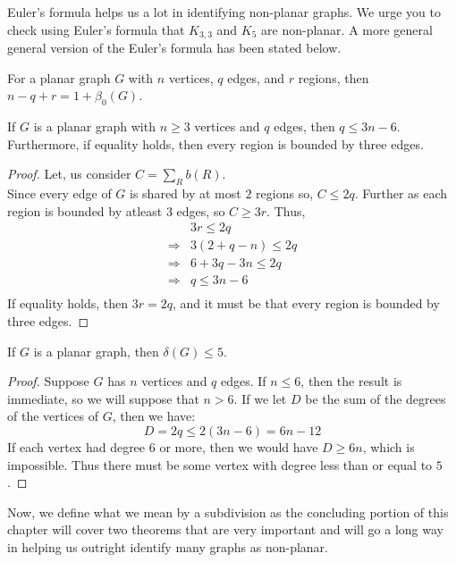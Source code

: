 \documentclass[../basic_graph_theory.tex]{subfiles}
\begin{document}
Euler's formula helps us a lot in identifying non-planar graphs. We urge you to check using Euler's formula that $K_{3,3}$ and $K_5$ are non-planar. A more general general version of the Euler's formula has been stated below.

\begin{thm}
    For a planar graph $G$ with $n$ vertices, $q$ edges, and $r$ regions, then $n-q+r=1+\beta_{0}(G)$.
\end{thm}

\begin{thm}
    If $G$ is a planar graph with $n \ge 3$ vertices and $q$ edges, then $q \le 3n - 6$. Furthermore, if equality holds, then every region is bounded by three edges.
\end{thm}
\begin{proof}
    Let, us consider $C=\sum_{R}b(R)$.\\
    Since every edge of $G$ is shared by at most $2$ regions so, $C \le 2q$. Further as each region is bounded by atleast $3$ edges, so $C \ge 3r$. Thus,\\
    \begin{align*}
        &3r \le 2q\\
        \Longrightarrow &3(2+q-n) \le 2q\\
        \Longrightarrow &6+3q-3n \le 2q\\
        \Longrightarrow &q \le 3n-6\\
    \end{align*}
    If equality holds, then $3r = 2q$, and it must be that every region is bounded by three edges.
\end{proof}

\begin{thm}
    If $G$ is a planar graph, then $\delta(G) \le 5$.
\end{thm}
\begin{proof}
    Suppose $G$ has $n$ vertices and $q$ edges. If $n \le 6$, then the result is immediate, so we will suppose that $n > 6$. If we let $D$ be the sum of the degrees of the vertices of $G$, then we have:\\
    \begin{equation*}
        D = 2q \le 2(3n - 6) = 6n - 12
    \end{equation*}
    If each vertex had degree $6$ or more, then we would have $D \ge 6n$, which is impossible. Thus there must be some vertex with degree less than or equal to $5$.
\end{proof}

Now, we define what we mean by a subdivision as the concluding portion of this chapter will cover two theorems that are very important and will go a long way in helping us outright identify many graphs as non-planar.\\
\end{document}
